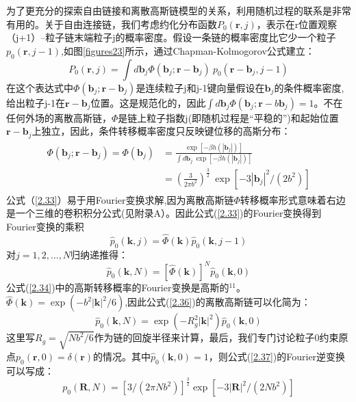 为了更充分的探索自由链接和离散高斯链模型的关系，利用随机过程的联系是非常有用的。关于自由连接链，我们考虑约化分布函数$P_{0}(\mathbf{r},j)$，表示在r位置观察（j+1）--粒子链末端粒子j的概率密度。假设一条链的概率密度比它少一个粒子$p_{0}(\mathbf{r},j-1)$,如图\ref{figures23}所示，通过Chapman-Kolmogorov公式建立：
\begin{equation}\label{2.33}
P_{0}(\mathbf{r},j)=\int d\mathbf{b}_{j} \varPhi (\mathbf{b}_{j};\mathbf{r}-\mathbf{b}_{j})~p_{0}(\mathbf{r}-\mathbf{b}_{j},j-1)
\end{equation}
在这个表达式中$\varPhi (\mathbf{b}_{j};\mathbf{r}-\mathbf{b}_{j})$是连续粒子j和j-1键向量假设在$\mathbf{b}_{j}$的条件概率密度,给出粒子j-1在$\mathbf{r}-\mathbf{b}_{j}$位置。这是规范化的，因此$\int d\mathbf{b}_{j} \varPhi (\mathbf{b}_{j};\mathbf{r}-b\mathbf{b}_{j})=1$。不在任何外场的离散高斯链，$\varPhi$是链上粒子指数j(即随机过程是“平稳的”)和起始位置$\mathbf{r}-\mathbf{b}_{j}$上独立，因此，条件转移概率密度只反映键位移的高斯分布：
\begin{equation}\label{2.34}
\begin{split}
\begin{aligned}
\varPhi(\mathbf{b}_{j};\mathbf{r}-\mathbf{b}_{j})=\varPhi(\mathbf{b}_{j})&=\frac{\exp[-\beta h(|\mathbf{b}_{j}|)]}{\int d\mathbf{b}_{j}~\exp[-\beta h(|\mathbf{b}_{j}|)]} \\ &=(\frac{3}{2 \pi b^2})^{\frac{3}{2}}~\exp[-3|\mathbf{b}_{j}|^2 / (2b^2)]
\end{aligned}
\end{split}
\end{equation}
公式（\ref{2.33}）易于用Fourier变换求解,因为离散高斯链$\varPhi$转移概率形式意味着右边是一个三维的卷积积分公式(见附录A）。因此公式(\ref{2.33})的Fourier变换得到Fourier变换的乘积
\begin{equation}\label{2.35}
\hat{p}_{0}(\mathbf{k},j)=\hat{\varPhi}(\mathbf{k})\hat{p}_{0}(\mathbf{k},j-1)
\end{equation}
对$j=1,2,\dots ,N$归纳递推得：
\begin{equation}\label{2.36}
\hat{p}_{0}(\mathbf{k},N)=[\hat{\varPhi}(\mathbf{k})]^N\hat{p}_{0}(\mathbf{k},0)
\end{equation}
公式(\ref{2.34})中的高斯转移概率的Fourier变换是高斯的$^{11}$。$\hat{\varPhi}(\mathbf{k})=\exp(-b^2|\mathbf{k}|^2/6)$,因此公式(\ref{2.36})的离散高斯链可以化简为：
\begin{equation}\label{2.37}
\hat{p}_{0}(\mathbf{k},N)=\exp(-R_{g}^2|\mathbf{k}|^2)\hat{p}_{0}(\mathbf{k},0)
\end{equation}
这里写$R_{g}=\sqrt{Nb^2/6}$作为链的回旋半径来计算，最后，我们专门讨论粒子0约束原点$p_{0}(\mathbf{r},0)=\delta(\mathbf{r})$的情况。其中$\hat{p}_{0}(\mathbf{k},0)=1$，则公式(\ref{2.37})的Fourier逆变换可以写成：
\begin{equation}\label{2.38}
p_{0}(\mathbf{R},N)=[3/(2\pi Nb^2)]^\frac{3}{2}\exp[-3|\mathbf{R}|^2/(2Nb^2)]
\end{equation}

